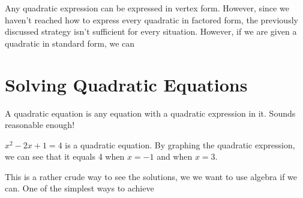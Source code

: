 Any quadratic expression can be expressed in vertex form.  However, since we haven't reached how to express every quadratic in factored form, the previously discussed strategy isn't sufficient for every situation.  However, if we are given a quadratic in standard form, we can 



\section*{Solving Quadratic Equations}

A quadratic equation is any equation with a quadratic expression in it.  Sounds reasonable enough!

\begin{example}
$x^2 - 2x + 1 = 4$ is a quadratic equation.  By graphing the quadratic expression, we can see that it equals 4 when $x = -1$ and when $x = 3$.
\end{example}

This is a rather crude way to see the solutions, we we want to use algebra if we can.  One of the simplest ways to achieve